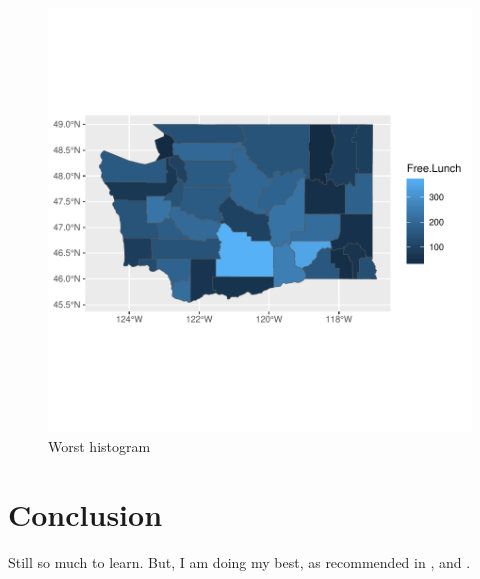 \documentclass[a4paper, 12pt]{article}
\begin{document}
\begin{figure}[h]
\centering
\includegraphics{draft_paper-theDeli_4}
\caption{Worst histogram}  %
\label{fig:theDeli_4} %
\end{figure}


\section{Conclusion}

Still so much to learn. But, I am doing my best, as recommended in \citet{magallanes_reyes_data_2022}, and \citet{leisch_sweave_2024}. 



\end{document}
